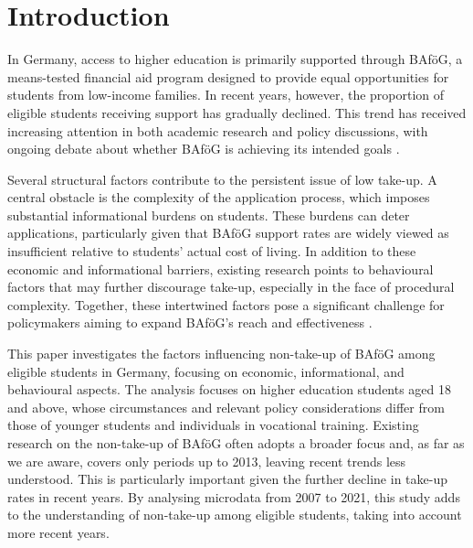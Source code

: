 \section{Introduction}




In Germany, access to higher education is primarily supported through BAföG, a means-tested financial aid program designed to provide equal opportunities for students from low-income families. In recent years, however, the proportion of eligible students receiving support has gradually declined. This trend has received increasing attention in both academic research and policy discussions, with ongoing debate about whether BAföG is achieving its intended goals \citep{gwosc_krisenbewaltigung_2022, meier_bafog_2024}.

Several structural factors contribute to the persistent issue of low take-up. 
A central obstacle is the complexity of the application process, which imposes substantial informational burdens on students. 
These burdens can deter applications, particularly given that BAföG support rates are widely viewed as insufficient relative to students’ actual cost of living. 
In addition to these economic and informational barriers, existing research points to behavioural factors that may further discourage take-up, especially in the face of procedural complexity. 
Together, these intertwined factors pose a significant challenge for policymakers aiming to expand BAföG’s reach and effectiveness \citep{staack_von_2017, bhargava_psychological_2015, bolland_information_nodate}.

This paper investigates the factors influencing non-take-up of BAföG among eligible students in Germany, focusing on economic, informational, and behavioural aspects. 
The analysis focuses on higher education students aged 18 and above, whose circumstances and relevant policy considerations differ from those of younger students and individuals in vocational training.
Existing research on the non-take-up of BAföG often adopts a broader focus and, as far as we are aware, covers only periods up to 2013, leaving recent trends less understood.
This is particularly important given the further decline in take-up rates in recent years. 
By analysing microdata from 2007 to 2021, this study adds to the understanding of non-take-up among eligible students, taking into account more recent years.

